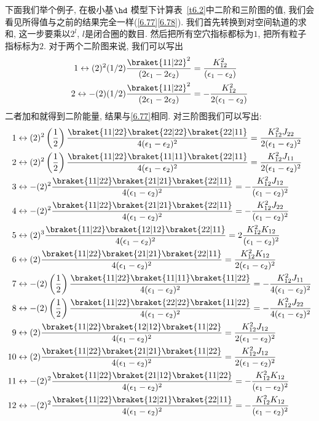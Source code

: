 下面我们举个例子, 
在极小基$\hd$ 模型下计算表~\autoref{t6.2}中二阶和三阶图的值, 
我们会看见所得值与之前的结果完全一样(\autoref{6.77}\autoref{6.78}). 
我们首先转换到对空间轨道的求和, 
这一步要乘以$2^l$, 
$l$是闭合圈的数目. 
然后把所有空穴指标都标为$1$, 
把所有粒子指标标为$2$. 
对于两个二阶图来说, 
我们可以写出
\begin{align*}
1\leftrightarrow (2)^2(1/2)\frac{\braket{11|22}^2}{(2\epsilon_1-2\epsilon_2)} & = \frac{K_{12}^2}{(\epsilon_1-\epsilon_2)}\\
2\leftrightarrow -(2)(1/2)\frac{\braket{11|22}^2}{(2\epsilon_1-2\epsilon_2)} & = -\frac{K_{12}^2}{2(\epsilon_1-\epsilon_2)}
\end{align*}
二者加和就得到二阶能量, 
结果与\autoref{6.77}相同. 
对三阶图我们可以写出:
\begin{align*}
1&\leftrightarrow (2)^2\left( \frac{1}{2} \right) \frac{\braket{11|22}\braket{22|22}\braket{22|11}}{4(\epsilon_1 - \epsilon_2)^2}  = \frac{K_{12}^2J_{22}}{2(\epsilon_1 - \epsilon_2)^2}\\
2&\leftrightarrow (2)^2\left( \frac{1}{2} \right) \frac{\braket{11|22}\braket{11|11}\braket{22|11}}{4(\epsilon_1 - \epsilon_2)^2}  = \frac{K_{12}^2J_{11}}{2(\epsilon_1 - \epsilon_2)^2}\\
3&\leftrightarrow -(2)^2 \frac{\braket{11|22}\braket{21|21}\braket{22|11}}{4(\epsilon_1 - \epsilon_2)^2}  = -\frac{K_{12}^2J_{12}}{(\epsilon_1 - \epsilon_2)^2}\\
4&\leftrightarrow -(2)^2 \frac{\braket{11|22}\braket{21|21}\braket{22|11}}{4(\epsilon_1 - \epsilon_2)^2}  = -\frac{K_{12}^2J_{22}}{(\epsilon_1 - \epsilon_2)^2}\\
5&\leftrightarrow (2)^3 \frac{\braket{11|22}\braket{12|12}\braket{22|11}}{4(\epsilon_1 - \epsilon_2)^2}  = 2\frac{K_{12}^2K_{12}}{(\epsilon_1 - \epsilon_2)^2}\\
6&\leftrightarrow (2) \frac{\braket{11|22}\braket{21|21}\braket{22|11}}{4(\epsilon_1 - \epsilon_2)^2}  = \frac{K_{12}^2K_{12}}{2(\epsilon_1 - \epsilon_2)^2}\\
7&\leftrightarrow -(2)\left( \frac{1}{2} \right) \frac{\braket{11|22}\braket{11|11}\braket{11|22}}{4(\epsilon_1 - \epsilon_2)^2}  = -\frac{K_{12}^2J_{11}}{4(\epsilon_1 - \epsilon_2)^2}\\
8&\leftrightarrow -(2)\left( \frac{1}{2} \right) \frac{\braket{11|22}\braket{22|22}\braket{11|22}}{4(\epsilon_1 - \epsilon_2)^2}  = -\frac{K_{12}^2J_{22}}{4(\epsilon_1 - \epsilon_2)^2}\\
9&\leftrightarrow (2) \frac{\braket{11|22}\braket{12|12}\braket{11|22}}{4(\epsilon_1 - \epsilon_2)^2}  = \frac{K_{12}^2J_{12}}{2(\epsilon_1 - \epsilon_2)^2}\\
10&\leftrightarrow (2) \frac{\braket{11|22}\braket{21|21}\braket{11|22}}{4(\epsilon_1 - \epsilon_2)^2}  = \frac{K_{12}^2J_{12}}{2(\epsilon_1 - \epsilon_2)^2}\\
11&\leftrightarrow -(2)^2 \frac{\braket{11|22}\braket{21|12}\braket{11|22}}{4(\epsilon_1 - \epsilon_2)^2}  = -\frac{K_{12}^2K_{12}}{(\epsilon_1 - \epsilon_2)^2}\\
12&\leftrightarrow -(2)^2 \frac{\braket{11|22}\braket{12|21}\braket{22|11}}{4(\epsilon_1 - \epsilon_2)^2}  = -\frac{K_{12}^2K_{12}}{(\epsilon_1 - \epsilon_2)^2}
\end{align*}
